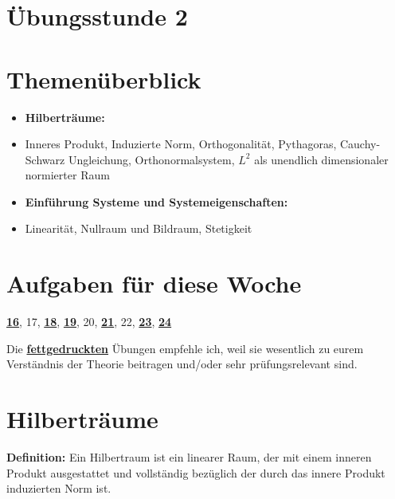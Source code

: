 \documentclass[11pt]{article}
\begin{document}
\thispagestyle{firstpage}

\setlength{\headheight}{1 \baselineskip}  %
\setlength{\parindent}{0pt}  %
\setlength{\parskip}{\baselineskip}  %

\vspace*{-5px}
\section*{Übungsstunde 2}

\section*{Themenüberblick}
\begin{itemize}
    \item \textbf{Hilberträume:}
    \item[] Inneres Produkt, Induzierte Norm, Orthogonalität, Pythagoras, Cauchy-Schwarz Ungleichung, Orthonormalsystem, $L^2$ als unendlich dimensionaler normierter Raum
    \item \textbf{Einführung Systeme und Systemeigenschaften:}
    \item[] Linearität, Nullraum und Bildraum, Stetigkeit
\end{itemize}

\section*{Aufgaben für diese Woche}
\vspace{-0.5cm}

\underline{\textbf{16}}, 17, \underline{\textbf{18}}, \underline{\textbf{19}}, 20, \underline{\textbf{21}}, 22, \underline{\textbf{23}}, \underline{\textbf{24}}\\
\vspace{-0.5cm}

Die \underline{\textbf{fettgedruckten}} Übungen empfehle ich, weil sie wesentlich zu eurem Verständnis der Theorie beitragen und/oder sehr prüfungsrelevant sind.

\vfill \null
\pagebreak

\section*{Hilberträume}

\vspace*{-0.5cm}
\textbf{Definition:} Ein Hilbertraum ist ein linearer Raum, der mit einem inneren Produkt ausgestattet und vollständig bezüglich der durch das innere Produkt induzierten Norm ist.
\end{document}
